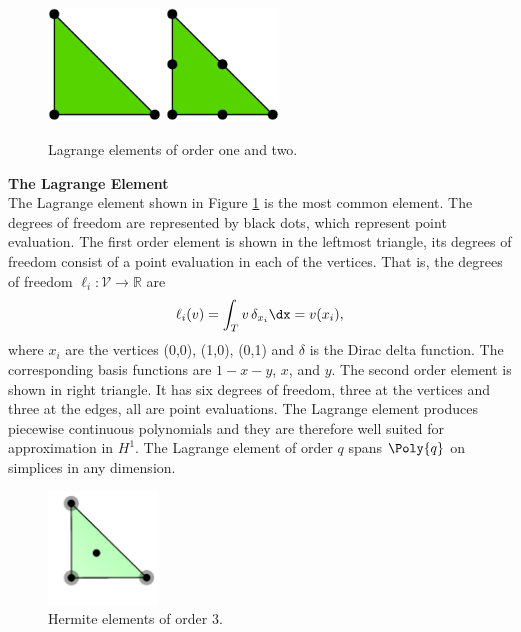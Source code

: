 \begin{figure}
  \begin{center}
    \includegraphics[height=3cm]{chapters/kirby-6/pdf/P1.pdf} \hspace{1.0cm}
    \includegraphics[height=3cm]{chapters/kirby-6/pdf/P2.pdf} \hspace{1.0cm}
    \caption{Lagrange elements of order one and two.}
    \label{Lagrange}
  \end{center}
\end{figure}

\begin{example}{\bf{The Lagrange Element}} \\
The Lagrange element shown in Figure \ref{Lagrange} is the most common
element.  The degrees of freedom are represented by black dots, which
represent point evaluation.  The first order element is shown in the
leftmost triangle, its degrees of freedom consist of a point evaluation
in each of the vertices.  That is, the degrees of freedom $\ell_i :
\mathcal{V} \rightarrow \mathbb{R}$ are
\begin{equation}
\ell_i ( v) = \int_{T} v \, \delta_{x_i} \dx = v(x_i),
\end{equation}
where $x_i$ are the vertices (0,0), (1,0), (0,1) and $\delta$ is the Dirac delta function.  The corresponding basis
functions are $1-x-y$, $x$, and $y$.  The second order element is shown
in right triangle. It has six degrees of freedom, three at the vertices
and three at the edges, all are point evaluations.  The Lagrange element
produces piecewise continuous polynomials and they are therefore well
suited for approximation in $H^1$.  The Lagrange element of order $q$
spans $\Poly{q}$ on simplices in any dimension.
\end{example}

\begin{figure}
  \begin{center}
    \includegraphics[height=3cm]{chapters/kirby-6/png/HER_2d.png}
    \caption{Hermite elements of order 3.}
    \label{Hermite}
  \end{center}
\end{figure}

